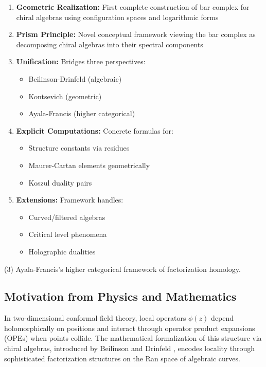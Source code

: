 \begin{tcolorbox}[title=Key Contributions of This Work]
\begin{enumerate}
\item \textbf{Geometric Realization:} First complete construction of bar complex for chiral algebras using configuration spaces and logarithmic forms

\item \textbf{Prism Principle:} Novel conceptual framework viewing the bar complex as decomposing chiral algebras into their spectral components

\item \textbf{Unification:} Bridges three perspectives:
   \begin{itemize}
   \item Beilinson-Drinfeld (algebraic)
   \item Kontsevich (geometric)
   \item Ayala-Francis (higher categorical)
   \end{itemize}

\item \textbf{Explicit Computations:} Concrete formulas for:
   \begin{itemize}
   \item Structure constants via residues
   \item Maurer-Cartan elements geometrically
   \item Koszul duality pairs
   \end{itemize}

\item \textbf{Extensions:} Framework handles:
   \begin{itemize}
   \item Curved/filtered algebras
   \item Critical level phenomena
   \item Holographic dualities
   \end{itemize}
\end{enumerate}
\end{tcolorbox}

(3) Ayala-Francis's higher categorical framework of factorization homology.
 
\subsection{Motivation from Physics and Mathematics}
 
In two-dimensional conformal field theory, local operators $\phi(z)$ depend holomorphically on positions and interact through operator product expansions (OPEs) when points collide. The mathematical formalization of this structure via chiral algebras, introduced by Beilinson and Drinfeld \cite{BD04}, encodes locality through sophisticated factorization structures on the Ran space of algebraic curves.
 
